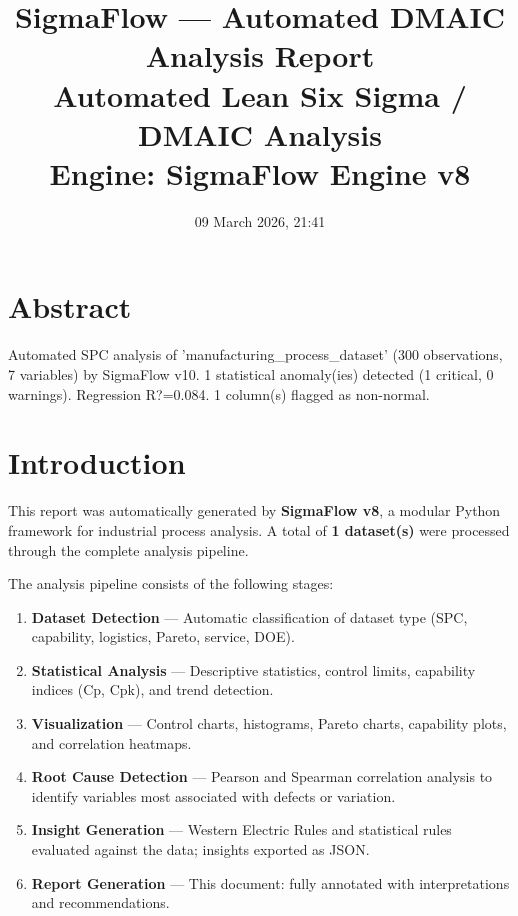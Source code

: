 \documentclass[12pt,a4paper]{article}
\title{
  \vspace{1.5cm}
  {\color{sigmaBlue}\Huge\bfseries SigmaFlow --- Automated DMAIC Analysis Report}\\[0.6em]
  {\large\color{sigmaGray} Automated Lean Six Sigma / DMAIC Analysis}\\[2em]
  {\normalsize\textbf{Engine:} SigmaFlow Engine v8}
}
\author{}
\date{09 March 2026, 21:41}
\begin{document}
\maketitle
\thispagestyle{empty}
\newpage

\section*{Abstract}

\begin{flushleft}
\colorbox{abstractBg}{\parbox{0.96\textwidth}{
\smallskip
Automated SPC analysis of 'manufacturing\_process\_dataset' (300 observations, 7 variables) by SigmaFlow v10. 1 statistical anomaly(ies) detected (1 critical, 0 warnings). Regression R?=0.084. 1 column(s) flagged as non-normal.
\smallskip
}}
\end{flushleft}

\newpage
\tableofcontents
\newpage

\section{Introduction}


This report was automatically generated by \textbf{SigmaFlow v8}, a modular
Python framework for industrial process analysis. A total of
\textbf{1 dataset(s)} were processed through the complete analysis pipeline.

\medskip

The analysis pipeline consists of the following stages:

\begin{enumerate}[leftmargin=2em]
  \item \textbf{Dataset Detection} — Automatic classification of dataset type
        (SPC, capability, logistics, Pareto, service, DOE).
  \item \textbf{Statistical Analysis} — Descriptive statistics, control limits,
        capability indices (Cp, Cpk), and trend detection.
  \item \textbf{Visualization} — Control charts, histograms, Pareto charts,
        capability plots, and correlation heatmaps.
  \item \textbf{Root Cause Detection} — Pearson and Spearman correlation analysis
        to identify variables most associated with defects or variation.
  \item \textbf{Insight Generation} — Western Electric Rules and statistical
        rules evaluated against the data; insights exported as JSON.
  \item \textbf{Report Generation} — This document: fully annotated with
        interpretations and recommendations.
\end{enumerate}
\end{document}
